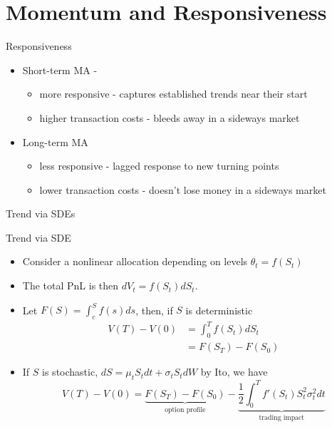 \section{Momentum and Responsiveness}
\begin{frame}{Responsiveness}
    \begin{itemize}
    \item 
    Short-term MA  - 
    \begin{itemize}
     \item more responsive - captures established trends near their start 
      \item higher transaction costs - bleeds away in a sideways market
    \end{itemize}
    \item 
    Long-term MA 
    \begin{itemize}
        \item less responsive - lagged response to new turning points  
        \item lower transaction costs - doesn't lose money in a sideways market
    \end{itemize} 
    \end{itemize}
\end{frame}

\begin{frame}{Trend via SDEs}

\begin{alertblock}{Trend via SDE}
\begin{itemize}
    \item Consider a nonlinear allocation depending on levels $\theta_t=f(S_t)$
    \item The total PnL is then $dV_t = f(S_t)dS_t$.
    \item Let $F(S) = \int_c^S f(s)ds$, then, if $S$ is deterministic
    \begin{align*}
        V(T)-V(0) &= \int_0^T f(S_t)dS_t\\
                  & = F(S_T) -F(S_0)
    \end{align*}
    \item If $S$ is stochastic, $dS=\mu_t S_t dt + \sigma_t S_t dW$ by Ito, we have
    $$
    V(T) - V(0) = \underbrace{F(S_T)-F(S_0)}_\text{option profile} 
    - \underbrace{\frac{1}{2}\int_0^T f'(S_t)S_t^2\sigma_t^2 dt}_\text{trading impact}
    $$
        
    
\end{itemize}


\end{alertblock}
\end{frame}


